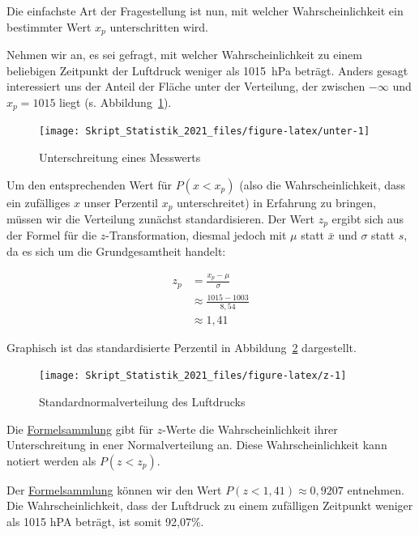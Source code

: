 \documentclass[
  11pt,
  ngerman,
  a4paper,
]{report}
\begin{document}
Die einfachste Art der Fragestellung ist nun, mit welcher Wahrscheinlichkeit ein bestimmter Wert \(x_p\) unterschritten wird.

Nehmen wir an, es sei gefragt, mit welcher Wahrscheinlichkeit zu einem beliebigen Zeitpunkt der Luftdruck weniger als 1015~hPa beträgt. Anders gesagt interessiert uns der Anteil der Fläche unter der Verteilung, der zwischen \(-\infty\) und \(x_p=1015\) liegt (s. Abbildung~\ref{fig:unter}).

\begin{figure}[H]

{\centering \texttt{[image: Skript\_Statistik\_2021\_files/figure-latex/unter-1]} 

}

\caption{Unterschreitung eines Messwerts}\label{fig:unter}
\end{figure}

Um den entsprechenden Wert für \(P(x < x_p)\) (also die Wahrscheinlichkeit, dass ein zufälliges \(x\) unser Perzentil \(x_p\) unterschreitet) in Erfahrung zu bringen, müssen wir die Verteilung zunächst standardisieren. Der Wert \(z_p\) ergibt sich aus der Formel für die \(z\)-Transformation, diesmal jedoch mit \(\mu\) statt \(\bar{x}\) und \(\sigma\) statt \(s\), da es sich um die Grundgesamtheit handelt:

\[\begin{aligned}
    z_p &= \frac{x_p-\mu}{\sigma} \\[4pt]
        &\approx \frac{1015-1003}{8{,}54}\\[4pt]
        &\approx 1{,}41
  \end{aligned}
\]

Graphisch ist das standardisierte Perzentil in Abbildung~\ref{fig:z} dargestellt.

\begin{figure}[H]

{\centering \texttt{[image: Skript\_Statistik\_2021\_files/figure-latex/z-1]} 

}

\caption{Standardnormalverteilung des Luftdrucks}\label{fig:z}
\end{figure}

Die \protect\hyperlink{formeln}{Formelsammlung} gibt für \(z\)-Werte die Wahrscheinlichkeit ihrer Unterschreitung in ener Normalverteilung an. Diese Wahrscheinlichkeit kann notiert werden als \(P(z<z_p)\).

Der \protect\hyperlink{formeln}{Formelsammlung} können wir den Wert \(P(z < 1,41) \approx 0,9207\) entnehmen. Die Wahrscheinlichkeit, dass der Luftdruck zu einem zufälligen Zeitpunkt weniger als 1015 hPA beträgt, ist somit 92,07\%.
\end{document}
